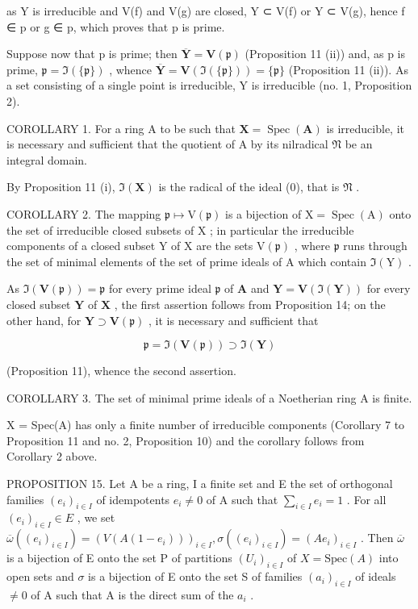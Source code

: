 as Y is irreducible and V(f) and V(g) are closed, Y ⊂ V(f) or Y ⊂ V(g), hence f ∈ p or g ∈ p, which proves that p is prime.

Suppose now that p is prime; then \(\overline{\mathbf{Y}} = \mathbf{V}(\mathfrak{p})\) (Proposition 11 (ii)) and, as p is prime, \(\mathfrak{p} = \Im(\{\mathfrak{p}\})\) , whence \(\overline{\mathbf{Y}} = \mathbf{V}(\Im(\{\mathfrak{p}\})) = \{\mathfrak{p}\}\) (Proposition 11 (ii)). As a set consisting of a single point is irreducible, Y is irreducible (no. 1, Proposition 2).

COROLLARY 1. For a ring A to be such that \(\mathbf{X} = \operatorname{Spec}(\mathbf{A})\) is irreducible, it is necessary and sufficient that the quotient of A by its nilradical \(\mathfrak{N}\) be an integral domain.

By Proposition 11 (i), \(\Im(\mathbf{X})\) is the radical of the ideal (0), that is \(\mathfrak{N}\) .

COROLLARY 2. The mapping \(\mathfrak{p} \mapsto \mathrm{V}(\mathfrak{p})\) is a bijection of \(\mathrm{X} = \operatorname{Spec}(\mathrm{A})\) onto the set of irreducible closed subsets of \(\mathrm{X}\) ; in particular the irreducible components of a closed subset \(\mathrm{Y}\) of \(\mathrm{X}\) are the sets \(\mathrm{V}(\mathfrak{p})\) , where \(\mathfrak{p}\) runs through the set of minimal elements of the set of prime ideals of \(\mathrm{A}\) which contain \(\Im(\mathrm{Y})\) .

As \(\Im (\mathbf{V}(\mathfrak{p})) = \mathfrak{p}\) for every prime ideal \(\mathfrak{p}\) of \(\mathbf{A}\) and \(\mathbf{Y} = \mathbf{V}(\Im (\mathbf{Y}))\) for every closed subset \(\mathbf{Y}\) of \(\mathbf{X}\) , the first assertion follows from Proposition 14; on the other hand, for \(\mathbf{Y} \supset \mathbf{V}(\mathfrak{p})\) , it is necessary and sufficient that

\[
\mathfrak {p} = \Im (\mathbf {V} (\mathfrak {p})) \supset \Im (\mathbf {Y})
\]

(Proposition 11), whence the second assertion.

COROLLARY 3. The set of minimal prime ideals of a Noetherian ring A is finite.

X = Spec(A) has only a finite number of irreducible components (Corollary 7 to Proposition 11 and no. 2, Proposition 10) and the corollary follows from Corollary 2 above.

PROPOSITION 15. Let A be a ring, I a finite set and E the set of orthogonal families \((e_i)_{i \in I}\) of idempotents \(e_i \neq 0\) of A such that \(\sum_{i \in I} e_i = 1\) . For all \((e_i)_{i \in I} \in E\) , we set \(\overline{\omega}((e_i)_{i \in I}) = (V(A(1 - e_i)))_{i \in I}, \sigma((e_i)_{i \in I}) = (Ae_i)_{i \in I}\) . Then \(\overline{\omega}\) is a bijection of E onto the set P of partitions \((U_i)_{i \in I}\) of \(X = \text{Spec}(A)\) into open sets and \(\sigma\) is a bijection of E onto the set S of families \((a_i)_{i \in I}\) of ideals \(\neq 0\) of A such that A is the direct sum of the \(a_i\) .

